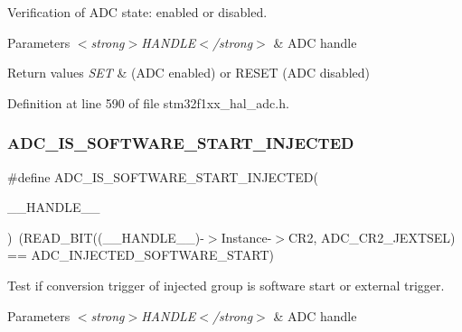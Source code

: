 Verification of A\+DC state\+: enabled or disabled. 


\begin{DoxyParams}{Parameters}
{\em $<$strong$>$\+H\+A\+N\+D\+L\+E$<$/strong$>$} & A\+DC handle \\
\hline
\end{DoxyParams}

\begin{DoxyRetVals}{Return values}
{\em S\+ET} & (A\+DC enabled) or R\+E\+S\+ET (A\+DC disabled) \\
\hline
\end{DoxyRetVals}


Definition at line 590 of file stm32f1xx\+\_\+hal\+\_\+adc.\+h.

\mbox{\label{group___a_d_c___private___macros_gaa3a1c2197a097b9bb8159b6eb1ac8941}} 
\subsubsection{\texorpdfstring{A\+D\+C\+\_\+\+I\+S\+\_\+\+S\+O\+F\+T\+W\+A\+R\+E\+\_\+\+S\+T\+A\+R\+T\+\_\+\+I\+N\+J\+E\+C\+T\+ED}{ADC\_IS\_SOFTWARE\_START\_INJECTED}}
{\footnotesize\ttfamily \#define A\+D\+C\+\_\+\+I\+S\+\_\+\+S\+O\+F\+T\+W\+A\+R\+E\+\_\+\+S\+T\+A\+R\+T\+\_\+\+I\+N\+J\+E\+C\+T\+ED(\begin{DoxyParamCaption}\item[{}]{\+\_\+\+\_\+\+H\+A\+N\+D\+L\+E\+\_\+\+\_\+ }\end{DoxyParamCaption})~(R\+E\+A\+D\+\_\+\+B\+IT((\+\_\+\+\_\+\+H\+A\+N\+D\+L\+E\+\_\+\+\_\+)-\/$>$Instance-\/$>$C\+R2, A\+D\+C\+\_\+\+C\+R2\+\_\+\+J\+E\+X\+T\+S\+EL) == A\+D\+C\+\_\+\+I\+N\+J\+E\+C\+T\+E\+D\+\_\+\+S\+O\+F\+T\+W\+A\+R\+E\+\_\+\+S\+T\+A\+RT)}



Test if conversion trigger of injected group is software start or external trigger. 


\begin{DoxyParams}{Parameters}
{\em $<$strong$>$\+H\+A\+N\+D\+L\+E$<$/strong$>$} & A\+DC handle \\
\hline
\end{DoxyParams}

